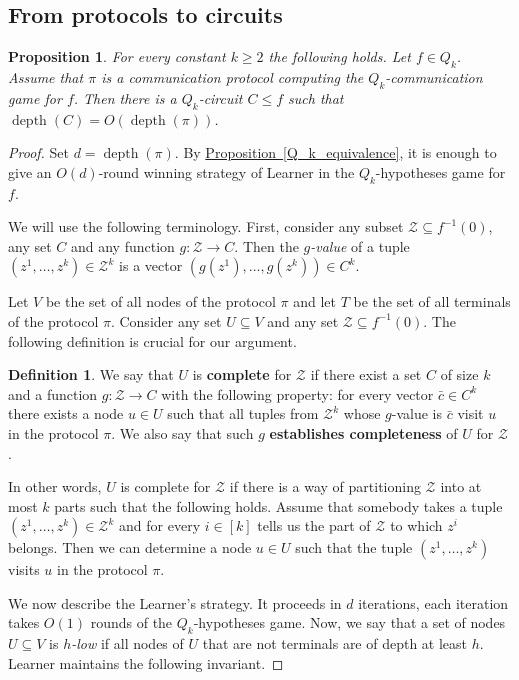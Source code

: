 \documentclass[11pt]{article}
\numberwithin{equation}{section}
\newtheorem{proposition}[theorem]{Proposition}
\theoremstyle{definition}
\newtheorem{definition}[theorem]{Definition}
\theoremstyle{plain}
\newcommand{\expref}[2]{\hyperref[#2]{#1~\ref{#2}}}
\DeclareMathOperator{\depth}{depth}  %
\begin{document}
\subsection{From protocols to circuits} \label{subsec:prot_to_circ}
\begin{proposition}
\label{Q_k_to_circuits}
For every constant $k\ge 2$ the following holds. Let $f\in Q_k$. Assume that $\pi$ is a communication protocol computing the $Q_k$-communication game for $f$. Then there is a $Q_k$-circuit $C \le f$ such that $\depth(C) = O(\depth(\pi))$.
\end{proposition}
\begin{proof}



Set $d = \depth(\pi)$. By \expref{Proposition}{Q_k_equivalence},
it is enough to give an $O(d)$-round winning strategy of Learner in the $Q_k$-hypotheses game for $f$.

We will use the following terminology. First, consider any subset $\mathcal{Z}\subseteq f^{-1}(0)$, any set $C$ and any function $g\colon \mathcal{Z}\to C$. Then the \emph{$g$-value} of a tuple $(z^1, \ldots, z^k) \in \mathcal{Z}^k$  is a vector $(g(z^1), \ldots, g(z^k)) \in C^k$.

Let $V$ be the set of all nodes of the protocol $\pi$ and let $T$ be the set of all terminals of the protocol $\pi$. Consider any set $U\subseteq V$ and any set $\mathcal{Z}\subseteq f^{-1}(0)$. The following definition is crucial for our argument.
\begin{definition}
 We say that $U$ is \textbf{complete} for $\mathcal{Z}$ if there exist a set $C$ of size $k$ and a function $g\colon\mathcal{Z}\to C$ with the following property: for every vector $\bar{c}\in C^k$ there exists a node $u\in U$ such that all tuples from $\mathcal{Z}^k$ whose $g$-value is $\bar{c}$ visit $u$ in the protocol $\pi$. We also say that such $g$ \textbf{establishes completeness} of $U$ for $\mathcal{Z}$.
\end{definition}

In other words, $U$ is complete for $\mathcal{Z}$ if there is a way of partitioning $\mathcal{Z}$ into at most $k$ parts such that the following holds. Assume that somebody takes a tuple $(z^1, \ldots, z^k)\in\mathcal{Z}^k$ and for every $i\in [k]$ tells us the part of $\mathcal{Z}$ to which $z^i$ belongs. Then we can determine a node $u\in U$ such that the tuple $(z^1, \ldots, z^k)$ visits $u$ in the protocol $\pi$.

We now describe the Learner's strategy. It proceeds in $d$ iterations, each iteration takes $O(1)$ rounds of the $Q_k$-hypotheses game. Now, we say that a set of nodes $U\subseteq V$ is \emph{$h$-low} if all nodes of $U$ that are not terminals are of depth at least $h$. Learner maintains the following invariant.


\end{proof}
\end{document}
